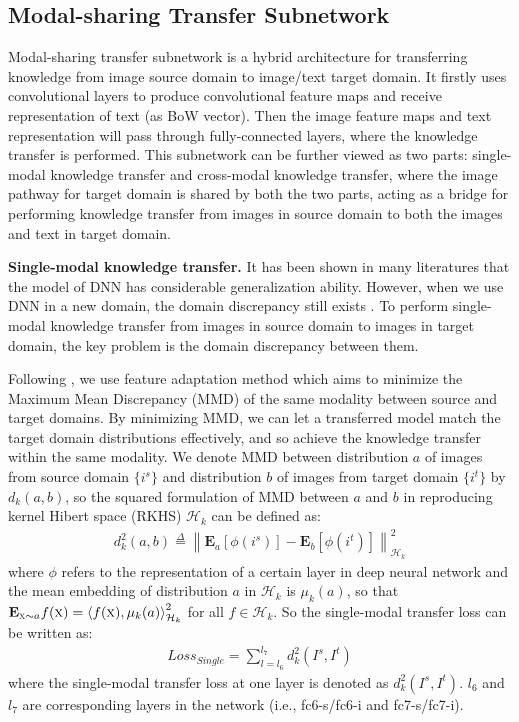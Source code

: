 \documentclass{article}
\begin{document}
\subsection{Modal-sharing Transfer Subnetwork}
Modal-sharing transfer subnetwork is a hybrid architecture for transferring knowledge from image source domain to image/text target domain. It firstly uses convolutional layers to produce convolutional feature maps and receive representation of text (as BoW vector). Then the image feature maps and text representation will pass through fully-connected layers, where the knowledge transfer is performed. This subnetwork can be further viewed as two parts: single-modal knowledge transfer and cross-modal knowledge transfer, where the image pathway for target domain is shared by both the two parts, acting as a bridge for performing knowledge transfer from images in source domain to both the images and text in target domain.

{\bf Single-modal knowledge transfer.} 
It has been shown in many literatures that the model of DNN has considerable generalization ability. However, when we use DNN in a new domain, the domain discrepancy still exists \cite{yosinski2014transferable}.
To perform single-modal knowledge transfer from images in source domain to images in target domain, the key problem is the domain discrepancy between them. 

Following \cite{DBLP:conf/icml/LongC0J15}, we use feature adaptation method \cite{gretton2012kernel} which aims to minimize the Maximum Mean Discrepancy (MMD) of the same modality between source and target domains. By minimizing MMD, we can let a transferred model match the target domain distributions effectively, and so achieve the knowledge transfer within the same modality. We denote MMD between distribution $a$ of images from source domain $\{ i^s \}$ and distribution $b$ of images from target domain $\{ i^t \}$ by $d_k(a,b)$, so the squared formulation of MMD between $a$ and $b$ in reproducing kernel Hibert space (RKHS) $\mathcal{H}_k$ can be defined as:
\begin{align}
d_k^2(a,b)\overset{\Delta}{=}\left \| \mathbf{E}_a[\phi(i^s)]-\mathbf{E}_b[\phi(i^t)] \right \|^2_{\mathcal{H}_k}
\end{align}
where $\phi$ refers to the representation of a certain layer in deep neural network and the mean embedding of distribution $a$ in $\mathcal{H}_k$ is $\mu_k(a)$, so that $\mathbf{E}_{\textsc{x}\sim a}f(\textsc{x})=\left \langle f(\textsc{x}),\mu _k(a) \right \rangle_{\mathcal{H}_k}^2$ for all $f\in \mathcal{H}_k$. 
So the single-modal transfer loss can be written as:
\begin{align}
Loss_{Single}=  \sum_{l=l_6}^{l_7}d_k^2(I^s,I^t)
\end{align}
where the single-modal transfer loss at one layer is denoted as $d_k^2(I^s,I^t)$. $l_6$ and $l_7$ are corresponding layers in the network (i.e., fc6-s/fc6-i and fc7-s/fc7-i).
\end{document}
